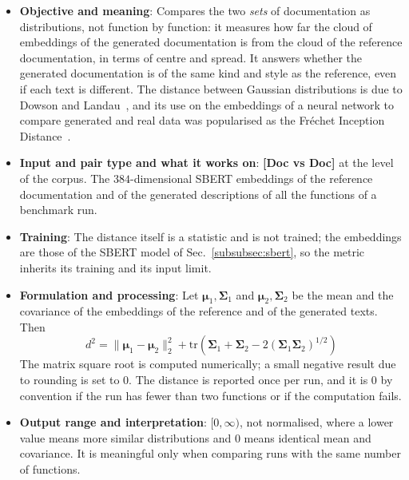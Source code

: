 \begin{itemize}[leftmargin=*, label=\textbullet]
	\item \textbf{Objective and meaning}: Compares the two \emph{sets} of documentation as
	distributions, not function by function: it measures how far the cloud of embeddings of the
	generated documentation is from the cloud of the reference documentation, in terms of centre
	and spread. It answers whether the generated documentation is of the same kind and style as
	the reference, even if each text is different. The distance between Gaussian distributions
	is due to Dowson and Landau~\cite{dowson_frechet_1982}, and its use on the embeddings of a
	neural network to compare generated and real data was popularised as the Fr\'echet Inception
	Distance~\cite{heusel_gans_2017}.

	\item \textbf{Input and pair type and what it works on}: \textbf{[Doc vs Doc]} at the level of the
	corpus. The $384$-dimensional SBERT embeddings of the reference documentation and of the generated
	descriptions of all the functions of a benchmark run.

	\item \textbf{Training}: The distance itself is a statistic and is not trained; the embeddings are
	those of the SBERT model of Sec.~\ref{subsubsec:sbert}, so the metric inherits its training and
	its input limit.

	\item \textbf{Formulation and processing}: Let $\boldsymbol{\mu}_1,\boldsymbol{\Sigma}_1$ and
	$\boldsymbol{\mu}_2,\boldsymbol{\Sigma}_2$ be the mean and the covariance of the embeddings of the
	reference and of the generated texts. Then
	\begin{equation}
		d^2=\|\boldsymbol{\mu}_1-\boldsymbol{\mu}_2\|_2^2
		+\mathrm{tr}\!\left(\boldsymbol{\Sigma}_1+\boldsymbol{\Sigma}_2
		-2(\boldsymbol{\Sigma}_1\boldsymbol{\Sigma}_2)^{1/2}\right)
		\label{eq:frechet}
	\end{equation}
	The matrix square root is computed numerically; a small negative result due to rounding is set
	to $0$. The distance is reported once per run, and it is $0$ by convention if the run has fewer
	than two functions or if the computation fails.

	\item \textbf{Output range and interpretation}: $[0,\infty)$, not normalised, where a lower value
	means more similar distributions and $0$ means identical mean and covariance. It is meaningful
	only when comparing runs with the same number of functions.


\end{itemize}

